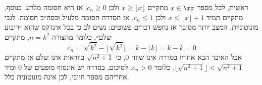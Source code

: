 \begin{solbox}
   ראשית, לכל מספר
   $x\in\rr$
   מתקיים
   $x\ge \lfloor x\rfloor$
   ולכן
   $c_n\ge 0$,
   אז היא חסומה מלרע.
   בנוסף, מתקיים תמיד
   $x\le \lfloor x\rfloor +1$
   ולכן
   $c_n\le 1$,
   אז הסדרה חסומה מלעיל ובסה״כ חסומה.
לגבי מונוטוניות, המצב יותר מסובך אז נחפש דברים פשוטים: נשים לב כי בכל אינדקס שהוא ״ריבוע שלם״, כלומר מהצורה
$n=k^2$,
מתקיים
$$c_n=\sqrt{k^2}-\lfloor \sqrt{k^2}\rfloor=k-\lfloor k\rfloor=k-k=0$$
אבל האיבר הבא אחריו בסדרה אינו
שווה
$0$,
 כי
 $\sqrt{n^2+1}$
 בוודאות אינו שלם אז מתקיים
 $\lfloor \sqrt{n^2+1}\rfloor< \sqrt{n^2+1}$,
 כלומר $c_n>0$.
 לסיכום, בסדרה יש אינסוף מופעים של
 $0$
 ומיד אחריהם מספר חיובי, לכן אינה מונוטונית כלל.

\end{solbox}
\eMs
\eE
